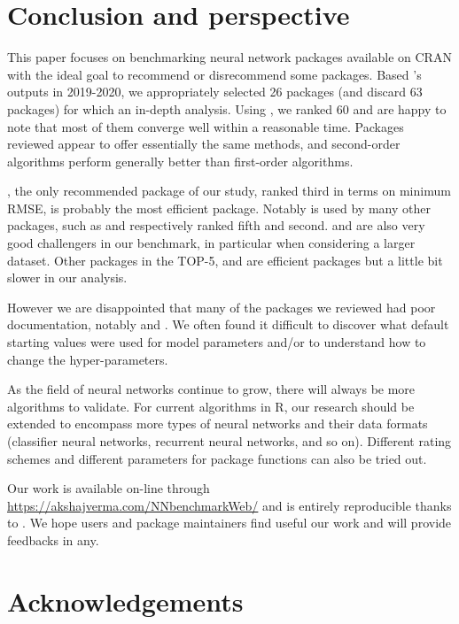 \hypertarget{conclusion-and-perspective}{%
\section{Conclusion and perspective}\label{conclusion-and-perspective}}

This paper focuses on benchmarking neural network packages available on
CRAN with the ideal goal to recommend or disrecommend some packages.
Based 's outputs in 2019-2020, we appropriately
selected 26 packages (and discard 63 packages) for which an in-depth
analysis. Using , we ranked 60
 and are happy to note that most of them
converge well within a reasonable time. Packages reviewed appear to
offer essentially the same methods, and second-order algorithms perform
generally better than first-order algorithms.

, the only recommended package of our study, ranked third
in terms on minimum RMSE, is probably the most efficient package.
Notably  is used by many other packages, such as
 and  respectively ranked fifth and
second.  and  are also very good
challengers in our benchmark, in particular when considering a larger
dataset. Other packages in the TOP-5,  and
 are efficient packages but a little bit slower in our
analysis.

However we are disappointed that many of the packages we reviewed had
poor documentation, notably  and .
We often found it difficult to discover what default starting values
were used for model parameters and/or to understand how to change the
hyper-parameters.

As the field of neural networks continue to grow, there will always be
more algorithms to validate. For current algorithms in \textsf{R}, our
research should be extended to encompass more types of neural networks
and their data formats (classifier neural networks, recurrent neural
networks, and so on). Different rating schemes and different parameters
for package functions can also be tried out.

Our work is available on-line through
\url{https://akshajverma.com/NNbenchmarkWeb/} and is entirely
reproducible thanks to . We hope users and package
maintainers find useful our work and will provide feedbacks in any.

\hypertarget{acknowledgements}{%
\section{Acknowledgements}\label{acknowledgements}}

